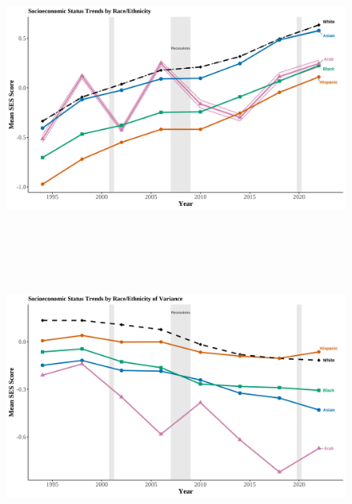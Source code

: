 \clearpage

\begin{center}
    \begin{figure}[H]
    \caption{}
    \includegraphics[width=\textwidth, height=9cm]{figure/07-SES-selfreport-race-ethn.png} 
    \label{fig:diag}
    \caption*{\footnotesize{}}
    \end{figure}
    \hfill%
\end{center}

\clearpage

\begin{center}
    \begin{figure}[H]
    \caption{}
    \includegraphics[width=\textwidth, height=9cm]{figure/11-var-SES-selfreport-race-ethn.png} 
    \label{fig:diag}
    \caption*{\footnotesize{}}
    \end{figure}
    \hfill%
\end{center}

\clearpage

% 

\newpage



